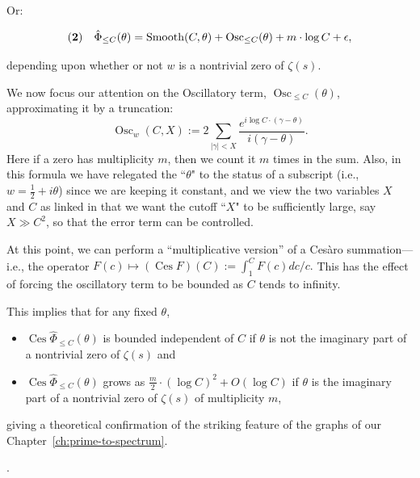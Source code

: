 \documentclass[openany]{book}
\DeclareMathOperator{\Osc}{Osc}
\DeclareMathOperator{\Smooth}{Smooth}
\DeclareMathOperator{\Ces}{Ces}
\newcommand{\ill}[3]{%
   \begin{figure}[H]%
   \vspace{-2ex}
   \centering%
   \texttt{[image: illustrations/\#1]}%
   \caption{#3}%
   \vspace{-2ex}
    \end{figure}}
\theoremstyle{plain}
\theoremstyle{definition}
\begin{document}
{{           Or:

           $${\bf(2)}\ \ \ {\hat \Phi}_{\le C}(\theta) = {\Smooth}(C,\theta)+  {\Osc}_{\le C}(\theta) +  m\cdot \log C +\epsilon,$$

           depending upon whether or not $w$ is a nontrivial zero of $\zeta(s)$.


 We now focus our attention on the Oscillatory term,  ${\Osc}_{\le C}(\theta) $, approximating it by a truncation:  $$\Osc_w(C,X):=  2\sum_{|\gamma| <
 X} {{\frac{e^{i\log C\cdot (\gamma-\theta)}}{i(\gamma-\theta)}}}.$$
Here if a zero has multiplicity $m$, then we count it $m$ times in the sum.
Also, in this formula we have relegated the ``$\theta$" to the status of  a subscript
(i.e., $w = {\frac{1}{2}} +i\theta$) since we are keeping it constant, and we view the
two variables $X$ and $C$ as linked in that we want the cutoff ``$X$" to be sufficiently
large, say $X \gg C^2$, so that the error term can be controlled.

 At this point, we can perform a ``multiplicative version'' of  a Ces\`aro summation---i.e.,  the operator $F(c) \mapsto ({\Ces} F)(C):= \int_1^CF(c) dc/c.$
This has the effect of forcing the oscillatory term to be bounded as $C$ tends to infinity.

 This implies that for any fixed $\theta$,
\begin{itemize}
 \item ${\Ces}{\hat \Phi}_{\le C}(\theta)$  is bounded independent of $C$  if  $\theta$ is not the imaginary part of a nontrivial zero of $\zeta(s)$  and
 \item ${\Ces}{\hat \Phi}_{\le C}(\theta)$ grows as ${\frac{m}{2}}\cdot (\log C)^2 +O(\log C)$ if $\theta$ is the imaginary part of a nontrivial zero of $\zeta(s)$ of multiplicity $m$,
\end{itemize}
giving a theoretical confirmation of the striking feature of the
graphs of our Chapter~\ref{ch:prime-to-spectrum}.}.






}
\end{document}
